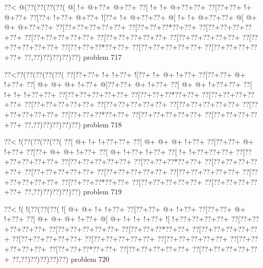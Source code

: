 \vbox{\vbox{\goo
\0??<\- @(\0??(\0??(\0??(\0??(
\- @[\- !+\- @+\0??+\- @+\0??+
\0??[\- !+\- !+\- @+\0??+\0??+
\0??[\0??+\0??+\- !+\- @+\0??+
\0??[\0??+\- !+\0??+\- @+\0??+
\- ![\0??+\- !+\- @+\0??+\0??+
\- @[\- !+\- !+\- @+\0??+\0??+
\- @[\- @+\- @+\- @+\0??+\0??+
\0??[\0??+\0??+\0??+\0??+\0??+
\0??[\0??+\0??+\0??*\0??+\0??+
\0??[\0??+\0??+\0??+\0??+\0??+
\0??[\0??+\0??+\0??+\0??+\0??+
\0??[\0??+\0??+\0??+\0??+\0??+
\0??[\0??+\0??+\0??+\0??+\0??+
\0??[\0??+\0??+\0??+\0??+\0??+
\0??[\0??+\0??+\0??*\0??+\0??+
\0??[\0??+\0??+\0??+\0??+\0??+
\0??[\0??+\0??+\0??+\0??+\0??+
\0??,\0??)\0??)\0??)\0??)\0??)
}
\hfil problem 717\hfil\break
}

\vbox{\vbox{\goo
\0??<\0??(\0??(\0??(\0??(\0??(
\0??[\0??+\0??+\- !+\- !+\0??+
\- ![\0??+\- !+\- @+\- !+\0??+
\0??[\0??+\0??+\- @+\- !+\0??+
\0??[\- @+\- @+\- @+\- !+\0??+
\- @[\0??+\0??+\- @+\- !+\0??+
\0??[\- @+\- @+\- !+\0??+\0??+
\0??[\- !+\- !+\- !+\0??+\0??+
\0??[\0??+\0??+\0??+\0??+\0??+
\0??[\0??+\0??+\0??*\0??+\0??+
\0??[\0??+\0??+\0??+\0??+\0??+
\0??[\0??+\0??+\0??+\0??+\0??+
\0??[\0??+\0??+\0??+\0??+\0??+
\0??[\0??+\0??+\0??+\0??+\0??+
\0??[\0??+\0??+\0??+\0??+\0??+
\0??[\0??+\0??+\0??*\0??+\0??+
\0??[\0??+\0??+\0??+\0??+\0??+
\0??[\0??+\0??+\0??+\0??+\0??+
\0??,\0??)\0??)\0??)\0??)\0??)
}
\hfil problem 718\hfil\break
}

\vbox{\vbox{\goo
\0??<\- !(\0??(\0??(\0??(\0??(
\0??[\- @+\- !+\- !+\0??+\0??+
\0??[\- @+\- @+\- @+\- !+\0??+
\0??[\0??+\0??+\- @+\- !+\0??+
\0??[\0??+\- @+\- @+\- !+\0??+
\0??[\- @+\- !+\0??+\- !+\0??+
\0??[\- !+\- !+\0??+\0??+\0??+
\0??[\0??+\0??+\0??+\0??+\0??+
\0??[\0??+\0??+\0??+\0??+\0??+
\0??[\0??+\0??+\0??*\0??+\0??+
\0??[\0??+\0??+\0??+\0??+\0??+
\0??[\0??+\0??+\0??+\0??+\0??+
\0??[\0??+\0??+\0??+\0??+\0??+
\0??[\0??+\0??+\0??+\0??+\0??+
\0??[\0??+\0??+\0??+\0??+\0??+
\0??[\0??+\0??+\0??*\0??+\0??+
\0??[\0??+\0??+\0??+\0??+\0??+
\0??[\0??+\0??+\0??+\0??+\0??+
\0??,\0??)\0??)\0??)\0??)\0??)
}
\hfil problem 719\hfil\break
}

\vbox{\vbox{\goo
\0??<\- !(\- !(\0??(\0??(\0??(
\- ![\- @+\- @+\- !+\- !+\0??+
\0??[\0??+\0??+\- @+\- !+\0??+
\0??[\0??+\0??+\- @+\- !+\0??+
\0??[\- @+\- @+\- @+\- !+\0??+
\- @[\- @+\- !+\- !+\- !+\0??+
\- ![\- !+\0??+\0??+\0??+\0??+
\0??[\0??+\0??+\0??+\0??+\0??+
\0??[\0??+\0??+\0??+\0??+\0??+
\0??[\0??+\0??+\0??*\0??+\0??+
\0??[\0??+\0??+\0??+\0??+\0??+
\0??[\0??+\0??+\0??+\0??+\0??+
\0??[\0??+\0??+\0??+\0??+\0??+
\0??[\0??+\0??+\0??+\0??+\0??+
\0??[\0??+\0??+\0??+\0??+\0??+
\0??[\0??+\0??+\0??*\0??+\0??+
\0??[\0??+\0??+\0??+\0??+\0??+
\0??[\0??+\0??+\0??+\0??+\0??+
\0??,\0??)\0??)\0??)\0??)\0??)
}
\hfil problem 720\hfil\break
}

